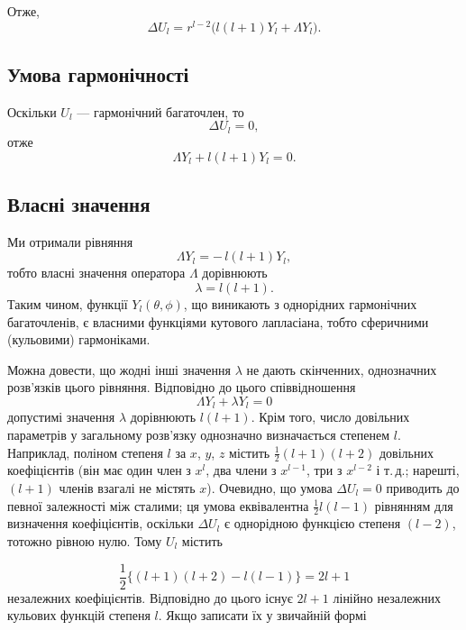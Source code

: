 \documentclass{article}
\begin{document}
\begin{tcolorbox}[vintagebox, title={\upshape\rule{4mm}{0.3pt}~~Виведення власних значень оператора $\Lambda$~~\rule{4mm}{0.3pt}}]
Отже,
\begin{equation}
\Delta U_l = r^{l-2}\big( l(l+1) Y_l + \Lambda Y_l \big).
\end{equation}

\subsection*{Умова гармонічності}
Оскільки $U_l$ --- гармонічний багаточлен, то
\begin{equation}
\Delta U_l = 0,
\end{equation}
отже
\begin{equation}
\Lambda Y_l + l(l+1) Y_l = 0.
\end{equation}

\subsection*{Власні значення}
Ми отримали рівняння
\begin{equation}
\Lambda Y_l = -\,l(l+1) Y_l,
\end{equation}
тобто власні значення оператора $\Lambda$ дорівнюють
\begin{equation}
\lambda = l(l+1).
\end{equation}
Таким чином, функції $Y_l(\theta,\phi)$, що виникають з однорідних гармонічних багаточленів, є власними функціями кутового лапласіана, тобто сферичними (кульовими) гармоніками.

\end{tcolorbox}

Можна довести, що жодні інші значення $\lambda$ не дають скінченних, однозначних розв'язків цього рівняння. Відповідно до цього співвідношення
\begin{equation*}
    \Lambda Y_l + \lambda Y_l = 0
\end{equation*}
допустимі значення $\lambda$ дорівнюють $l(l+1)$. Крім того, число довільних параметрів у загальному розв'язку однозначно визначається степенем $l$. Наприклад, поліном степеня $l$ за $x$, $y$, $z$ містить $\frac{1}{2}(l+1)(l+2)$ довільних коефіцієнтів (він має один член з $x^l$, два члени з $x^{l-1}$, три з $x^{l-2}$ і т.\,д.; нарешті, $(l+1)$ членів взагалі не містять $x$). Очевидно, що умова $\Delta U_l = 0$ приводить до певної залежності між сталими; ця умова еквівалентна $\frac{1}{2} l(l-1)$ рівнянням для визначення коефіцієнтів, оскільки $\Delta U_l$ є однорідною функцією степеня $(l-2)$, тотожно рівною нулю. Тому $U_l$ містить

\begin{equation}
\frac{1}{2} \{ (l+1)(l+2) - l(l-1) \} = 2l + 1
\end{equation}
%
незалежних коефіцієнтів. Відповідно до цього існує $2l+1$ лінійно незалежних кульових функцій степеня $l$. Якщо записати їх у звичайній формі
\end{document}
